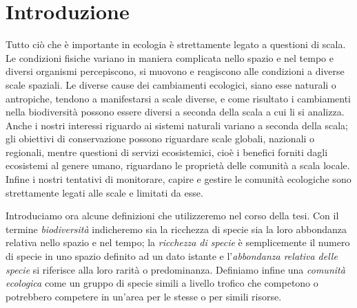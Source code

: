 \chapter*{Introduzione}
Tutto ciò che è importante in ecologia è strettamente legato a questioni di scala\cite{doi:10.1111/2041-210X.12319}. Le condizioni fisiche variano in maniera complicata nello spazio e nel tempo e diversi organismi percepiscono, si muovono e reagiscono alle condizioni a diverse scale spaziali. 
Le diverse cause dei cambiamenti ecologici, siano esse naturali o antropiche, tendono a manifestarsi a scale diverse, e come risultato i cambiamenti nella biodiversità possono essere diversi a seconda della scala a cui li si analizza. Anche i nostri interessi riguardo ai sistemi naturali variano a seconda della scala; gli obiettivi di conservazione possono riguardare scale globali, nazionali o regionali, mentre questioni di servizi ecosistemici, cioè i benefici forniti dagli ecosistemi al genere umano, riguardano le proprietà delle comunità a scala locale. Infine i nostri tentativi di monitorare, capire e gestire le comunità ecologiche sono strettamente legati alle scale e limitati da esse.

Introduciamo ora alcune definizioni che utilizzeremo nel corso della tesi. Con il termine \emph{biodiversità} indicheremo sia la ricchezza di specie sia la loro abbondanza relativa nello spazio e nel tempo; la \emph{ricchezza di specie} è semplicemente il numero di specie in uno spazio definito ad un dato istante e l'\emph{abbondanza relativa delle specie} si riferisce alla loro rarità o predominanza. Definiamo infine una \emph{comunità ecologica} come un gruppo di specie simili a livello trofico che competono o potrebbero competere in un'area per le stesse o per simili risorse. 
 
